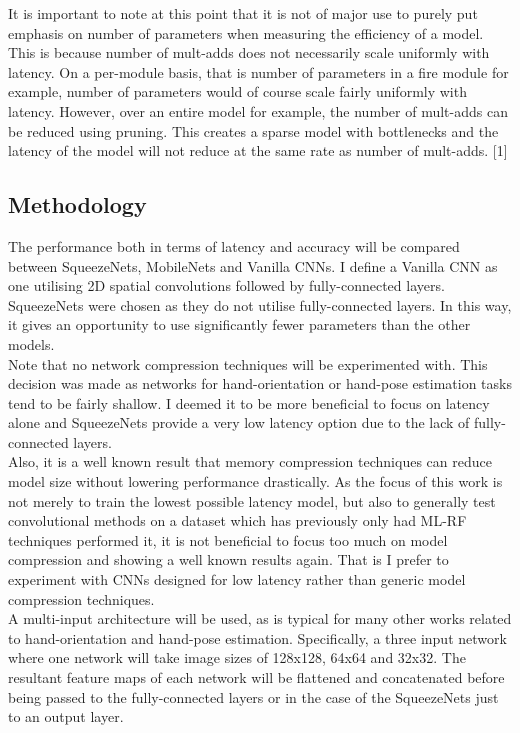 \documentclass{article}
\begin{document}
It is important to note at this point that it is not of major use to purely put emphasis on number of parameters when measuring the efficiency of a model. This is because number of mult-adds does not necessarily scale uniformly with latency. On a per-module basis, that is number of parameters in a fire module for example, number of parameters would of course scale fairly uniformly with latency. However, over an entire model for example, the number of mult-adds can be reduced using pruning. This creates a sparse model with bottlenecks and the latency of the model will not reduce at the same rate as number of mult-adds. [1] \\


\subsection*{Methodology}
The performance both in terms of latency and accuracy will be compared between SqueezeNets, MobileNets and Vanilla CNNs. I define a Vanilla CNN as one utilising 2D spatial convolutions followed by fully-connected layers. SqueezeNets were chosen as they do not utilise fully-connected layers. In this way, it gives an opportunity to use significantly fewer parameters than the other models.\\

Note that no network compression techniques will be experimented with. This decision was made as networks for hand-orientation or hand-pose estimation tasks tend to be fairly shallow. I deemed it to be more beneficial to focus on latency alone and SqueezeNets provide a very low latency option due to the lack of fully-connected layers.\\

Also, it is a well known result that memory compression techniques can reduce model size without lowering performance drastically. As the focus of this work is not merely to train the lowest possible latency model, but also to generally test convolutional methods on a dataset which has previously only had ML-RF techniques performed it, it is not beneficial to focus too much on model compression and showing a well known results again. That is I prefer to experiment with CNNs designed for low latency rather than generic model compression techniques.\\

A multi-input architecture will be used, as is typical for many other works related to hand-orientation and hand-pose estimation. Specifically, a three input network where one network will take image sizes of 128x128, 64x64 and 32x32. The resultant feature maps of each network will be flattened and concatenated before being passed to the fully-connected layers or in the case of the SqueezeNets just to an output layer.\\
\end{document}
